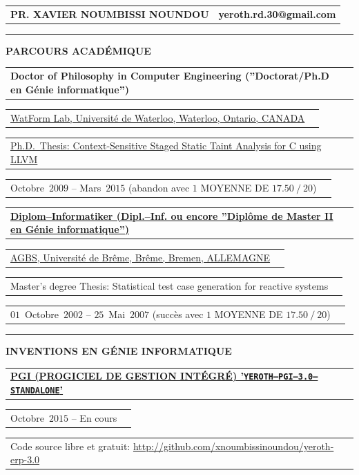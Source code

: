 \documentclass[9pt,a4paper]{article} %
\makeatletter
\newcommand{\myfullacademicname}{PR. XAVIER NOUMBISSI NOUNDOU\xspace}
\newcommand{\headerrow}[2]
{\begin{tabular*}{\linewidth}{l@{\extracolsep{\fill}}r}
	#1 &
	#2 \\
\end{tabular*}}
\newcommand{\headerrowONE}[1]{\headerrow{#1}{}}
\newcommand{\cvitemdate}[2]{#1~$#2$\xspace}
\makeatother
\begin{document}
\thispagestyle{OnlyFirstPage}

\bigskip


\headerrow{\Large \textbf{\myfullacademicname}}
{\Large \textbf{yeroth.rd.30@gmail.com}}

\vspace{1em}


\hrule
\begin{center}
{\large \textbf{PARCOURS ACADÉMIQUE}}
\end{center}

\vspace{0.5em}

\headerrowONE{\textbf{Doctor of Philosophy in Computer Engineering (''Doctorat/Ph.D en Génie informatique'')}}	
\headerrowONE{\href{http://watform.uwaterloo.ca/}{WatForm Lab, Université de Waterloo, Waterloo, Ontario, CANADA}}
\headerrowONE{\href{http://archive.org/download/yeroth-saint/YEROTH-SAINT.PDF}{Ph.D.~Thesis: Context-Sensitive Staged Static Taint Analysis for C using LLVM}}
\headerrowONE{\cvitemdate{Octobre}{2009} -- \cvitemdate{Mars}{2015} (abandon avec $1$ MOYENNE DE $17.50~/~20$)}	
	
\vspace{0.3em}
	
\headerrowONE{\href{http://www.informatik.uni-bremen.de/agbs/qualifikationsarbeiten/diplomarbeiten_e.html}{\textbf{Diplom--Informatiker (Dipl.--Inf. ou encore ''Diplôme de Master II en Génie informatique'')}}}
\headerrowONE{\href{http://www.informatik.uni-bremen.de/agbs/}{AGBS, Université de Brême, Brême, Bremen, ALLEMAGNE}}	
\headerrowONE{Master's degree Thesis: Statistical test case generation for reactive systems}
\headerrowONE{\cvitemdate{$01$~Octobre}{2002} -- \cvitemdate{$25$~Mai}{2007} (succès avec $1$ MOYENNE DE $17.50~/~20$)}	

\vspace{1em}

\hrule
\begin{center}
{\large \textbf{INVENTIONS EN GÉNIE INFORMATIQUE}}
\end{center}

\vspace{0.5em}

\headerrowONE{\href{http://archive.org/download/yeroth-erp-3-0-info-francais/yeroth-erp-3-0-info-francais.pdf}{\textbf{PGI (PROGICIEL DE GESTION INTÉGRÉ) '\texttt{YEROTH--PGI--3.0--STANDALONE}'}}}		
\headerrowONE{\cvitemdate{Octobre}{2015} -- En cours}
\headerrowONE{Code source libre et gratuit: \url{http://github.com/xnoumbissinoundou/yeroth-erp-3.0}}
\end{document}
